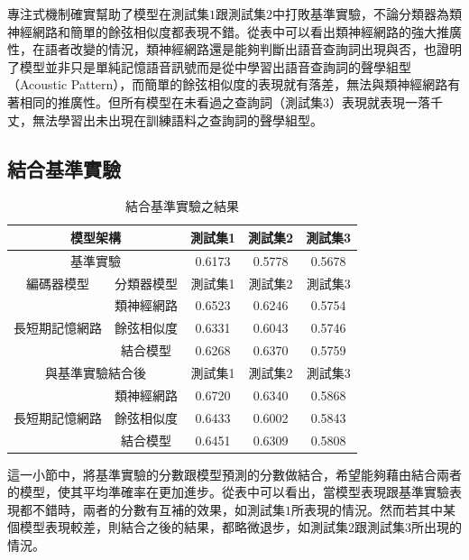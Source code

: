 專注式機制確實幫助了模型在測試集$1$跟測試集$2$中打敗基準實驗，不論分類器為類神經網路和簡單的餘弦相似度都表現不錯。從表中可以看出類神經網路的強大推廣性，在語者改變的情況，類神經網路還是能夠判斷出語音查詢詞出現與否，也證明了模型並非只是單純記憶語音訊號而是從中學習出語音查詢詞的聲學組型（Acoustic
Pattern），而簡單的餘弦相似度的表現就有落差，無法與類神經網路有著相同的推廣性。但所有模型在未看過之查詢詞（測試集$3$）表現就表現一落千丈，無法學習出未出現在訓練語料之查詢詞的聲學組型。

\subsection{結合基準實驗}
\begin{table}[ht]
	 \centering
	 \caption{結合基準實驗之結果}
	 \label{table:ch3_late_fusion}
	 \begin{tabular}{|c|c|c|c|c|}
		 \hline
		 \multicolumn{2}{|c|}{模型架構} & 測試集1 & 測試集2 & 測試集3 \\
		 \hline
		 \multicolumn{2}{|c|}{基準實驗} & 0.6173 & 0.5778 & 0.5678\\
		 \hline
		 \hline 
		 編碼器模型 & 分類器模型 & 測試集1 &測試集2 & 測試集3 \\
		 \hline
		 \multirow{3}{*}{長短期記憶網路} & 類神經網路 &
		 0.6523 &0.6246 & 0.5754 \\
		 \cline{2-5}
		 & 餘弦相似度& 0.6331 & 0.6043 & 0.5746 \\
		 \cline{2-5}
		 & 結合模型 & 0.6268 & 0.6370 & 0.5759 \\ 
		 \hline
		 \hline
		 \multicolumn{2}{|c|}{與基準實驗結合後} & 測試集1 &測試集2
		 &測試集3 \\
		 \hline
		 \multirow{3}{*}{長短期記憶網路} & 類神經網路 &
		 {\color{red}0.6720} & 0.6340 & 0.5868\\
		 \cline{2-5}
		 & 餘弦相似度& 0.6433&0.6002&0.5843 \\
		 \cline{2-5}
		 & 結合模型 &0.6451&0.6309	&0.5808 \\
		 \hline
	   \end{tabular}
\end{table}

這一小節中，將基準實驗的分數跟模型預測的分數做結合，希望能夠藉由結合兩者的模型，使其平均準確率在更加進步。從表中可以看出，當模型表現跟基準實驗表現都不錯時，兩者的分數有互補的效果，如測試集$1$所表現的情況。然而若其中某個模型表現較差，則結合之後的結果，都略微退步，如測試集$2$跟測試集$3$所出現的情況。

